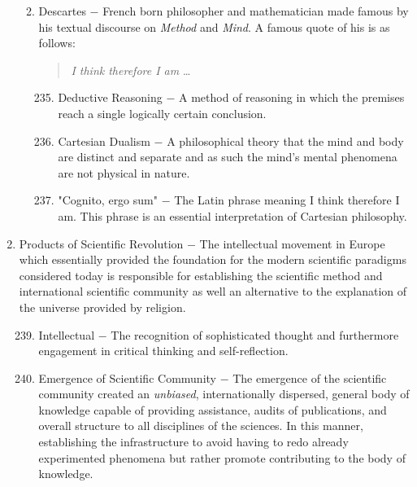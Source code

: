 \documentclass[12pt]{article}
\begin{document}
\begin{enumerate}
\begin{enumerate}[label=\arabic{*}.]
\begin{enumerate}[label=\arabic{*}.]
\end{enumerate}
\setcounter{enumii}{233}

\item Descartes $-$ French born philosopher and mathematician made famous by his textual discourse on \textit{Method} and \textit{Mind}. A famous quote of his is as follows: 
  \begin{quote}
    \textit{I think therefore I am} \dots
  \end{quote}

\begin{enumerate}[label=\arabic{*}.]
\setcounter{enumiii}{234}

\item Deductive Reasoning $-$ A method of reasoning in which the premises reach a single logically certain conclusion.

\item Cartesian Dualism $-$ A philosophical theory that the mind and body are distinct and separate and as such the mind's mental phenomena are not physical in nature. 

\item "Cognito, ergo sum" $-$ The Latin phrase meaning I think therefore I am. This phrase is an essential interpretation of Cartesian philosophy.

\end{enumerate}

\end{enumerate}
\setcounter{enumi}{237}

\item Products of Scientific Revolution $-$ The intellectual movement in Europe which essentially provided the foundation for the modern scientific paradigms considered today is responsible for establishing the scientific method and international scientific community as well an alternative to the explanation of the universe provided by religion.

\begin{enumerate}[label=\arabic{*}.]
\setcounter{enumii}{238}

\item Intellectual $-$ The recognition of sophisticated thought and furthermore engagement in critical thinking and self-reflection.

\item Emergence of Scientific Community $-$ The emergence of the scientific community created an \textit{unbiased}, internationally dispersed, general body of knowledge capable of providing assistance, audits of publications, and overall structure to all disciplines of the sciences. In this manner, establishing the infrastructure to avoid having to redo already experimented phenomena but rather promote contributing to the body of knowledge.


\end{enumerate}
\end{enumerate}
\end{document}
